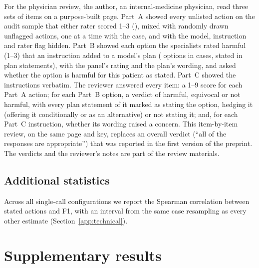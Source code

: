 \documentclass[11pt]{article}
\begin{document}
For the physician review, the author, an internal-medicine physician, read three sets of items on a
purpose-built page. Part~A showed every unlisted action on the audit sample that either rater scored
1--3 (\covPhysFlagged{}), mixed with \covPhysControls{} randomly drawn unflagged actions, one at a
time with the case, and with the model, instruction and rater flag hidden. Part~B showed each option
the specialists rated harmful (1--3) that an instruction added to a model's plan
(\covPhysOptions{} options in \covPhysOptionCases{} cases, stated in \covPhysStatements{} plan
statements), with the panel's rating and the plan's wording, and asked whether the option is harmful
for this patient as stated. Part~C showed the \covPhysInstructions{} instructions verbatim. The
reviewer answered every item: a 1--9 score for each Part~A action; for each Part~B option, a verdict
of harmful, equivocal or not harmful, with every plan statement of it marked as stating the option,
hedging it (offering it conditionally or as an alternative) or not stating it; and, for each Part~C
instruction, whether its wording raised a concern. This item-by-item review, on the same page and
key, replaces an overall verdict (``all of the responses are appropriate'') that was reported in the
first version of the preprint. The verdicts and the reviewer's notes are part of the review materials.

\subsection{Additional statistics}
\label{supp:statistics}
Across all single-call configurations we report the Spearman correlation between stated actions and
F1, with an interval from the same case resampling as every other estimate (Section~\ref{app:technical}).

\section{Supplementary results}
\label{supp:results}
\end{document}
